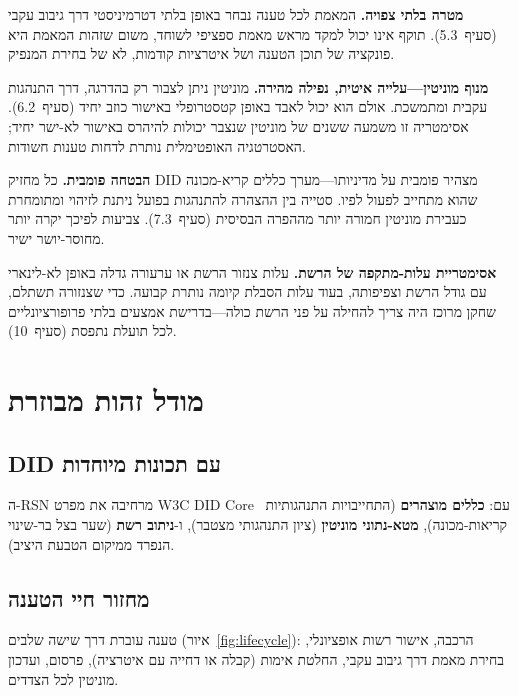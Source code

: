 \documentclass[11pt,a4paper,twocolumn]{article}
\begin{document}
\textbf{מטרה בלתי צפויה.} המאמת לכל טענה נבחר באופן בלתי דטרמיניסטי דרך גיבוב עקבי (סעיף~5.3). תוקף אינו יכול למקד מראש מאמת ספציפי לשוחד, משום שזהות המאמת היא פונקציה של תוכן הטענה ושל איטרציות קודמות, לא של בחירת המנפיק.

\textbf{מנוף מוניטין---עלייה איטית, נפילה מהירה.} מוניטין ניתן לצבור רק בהדרגה, דרך התנהגות עקבית ומתמשכת. אולם הוא יכול לאבד באופן קטסטרופלי באישור כוזב יחיד (סעיף~6.2). אסימטריה זו משמעה ששנים של מוניטין שנצבר יכולות להיהרס באישור לא-ישר יחיד; האסטרטגיה האופטימלית נותרת לדחות טענות חשודות.

\textbf{הבטחה פומבית.} כל מחזיק DID מצהיר פומבית על מדיניותו---מערך כללים קריא-מכונה שהוא מתחייב לפעול לפיו. סטייה בין ההצהרה להתנהגות בפועל ניתנת לזיהוי ומתומחרת כעבירת מוניטין חמורה יותר מההפרה הבסיסית (סעיף~7.3). צביעות לפיכך יקרה יותר מחוסר-יושר ישיר.

\textbf{אסימטריית עלות-מתקפה של הרשת.} עלות צנזור הרשת או ערעורה גדלה באופן לא-לינארי עם גודל הרשת וצפיפותה, בעוד עלות הסבלת קיומה נותרת קבועה. כדי שצנזורה תשתלם, שחקן מרוכז היה צריך להחילה על פני הרשת כולה---בדרישת אמצעים בלתי פרופורציונליים לכל תועלת נתפסת (סעיף~10).

\section{מודל זהות מבוזרת}

\subsection{DID עם תכונות מיוחדות}

ה-RSN מרחיבה את מפרט W3C DID Core~\cite{did2022} עם: \textbf{כללים מוצהרים} (התחייבויות התנהגותיות קריאות-מכונה), \textbf{מטא-נתוני מוניטין} (ציון התנהגותי מצטבר), ו-\textbf{ניתוב רשת} (שער בצל בר-שינוי הנפרד ממיקום הטבעת היציב).

\subsection{מחזור חיי הטענה}

טענה עוברת דרך שישה שלבים (איור~\ref{fig:lifecycle}): הרכבה, אישור רשות אופציונלי, בחירת מאמת דרך גיבוב עקבי, החלטת אימות (קבלה או דחייה עם איטרציה), פרסום, ועדכון מוניטין לכל הצדדים.
\end{document}
